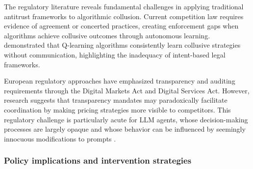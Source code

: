 The regulatory literature reveals fundamental challenges in applying traditional antitrust frameworks to algorithmic collusion. Current competition law requires evidence of agreement or concerted practices, creating enforcement gaps when algorithms achieve collusive outcomes through autonomous learning. \textcite{calvano_artificial_2020} demonstrated that Q-learning algorithms consistently learn collusive strategies without communication, highlighting the inadequacy of intent-based legal frameworks.

European regulatory approaches have emphasized transparency and auditing requirements through the Digital Markets Act and Digital Services Act. However, research suggests that transparency mandates may paradoxically facilitate coordination by making pricing strategies more visible to competitors. This regulatory challenge is particularly acute for LLM agents, whose decision-making processes are largely opaque and whose behavior can be influenced by seemingly innocuous modifications to prompts \parencite{lin_strategic_2025, fish_algorithmic_2025}.

% 
% 

\subsubsection*{Policy implications and intervention strategies}

